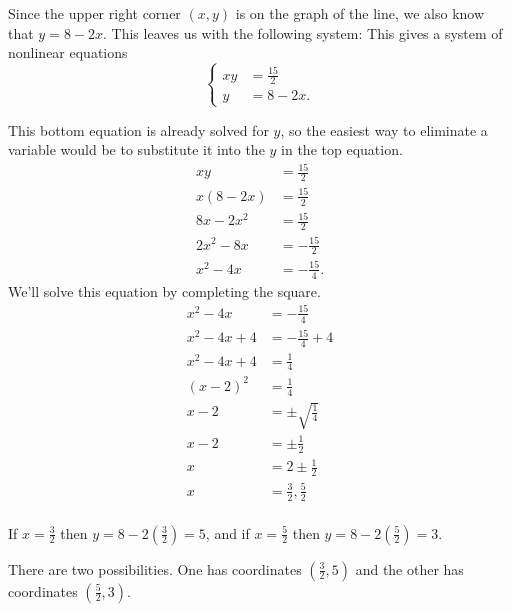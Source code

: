 \documentclass[nooutcomes]{ximera}
\begin{document}
\begin{exercise}
\begin{explanation}
			Since the upper right corner $(x,y)$ is on the graph of the line, we also know that $y=8-2x$. This leaves us with the following system:
			This gives a system of nonlinear equations
			$$	\begin{cases}
				xy &= \frac{15}{2}\\
				y &= 8-2x.
			\end{cases}	$$	
			
			This bottom equation is already solved for $y$, so the easiest way to eliminate a variable would be to substitute it into the $y$ in the top equation.
			\begin{align*}
				xy &= \frac{15}{2}\\
				x(8-2x) &= \frac{15}{2}\\
				8x - 2x^2 &= \frac{15}{2}\\
				2x^2 - 8x &= - \frac{15}{2}\\
				x^2 - 4x &= - \frac{15}{4}.
			\end{align*}
			We'll solve this equation by completing the square.
			\begin{align*}
				x^2 - 4x &= - \frac{15}{4}\\
				x^2 - 4x + 4&= - \frac{15}{4} + 4\\
				x^2 - 4x + 4&= \frac{1}{4}\\
				(x-2)^2 &= \frac{1}{4}\\
				x-2 &= \pm \sqrt{\frac{1}{4}}\\
				x-2 &= \pm \frac{1}{2}\\
				x &= 2 \pm \frac{1}{2}\\
				x &= \frac{3}{2}, \frac{5}{2}\\
			\end{align*}	
			
			If $x=\frac{3}{2}$ then $y=8-2\left(\frac{3}{2}\right) = 5$, and if $x=\frac{5}{2}$ then $y=8-2\left(\frac{5}{2}\right) = 3$.
			
			There are two possibilities. One has coordinates $\left( \frac{3}{2}, 5 \right)$ and the other has coordinates $\left( \frac{5}{2}, 3 \right)$.
		\end{explanation}
	\end{exercise}
\end{document}
